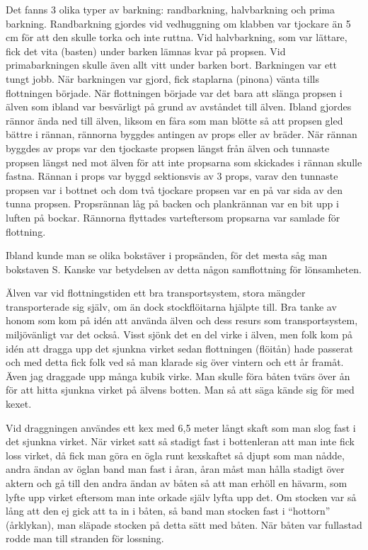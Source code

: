 Det fanns 3 olika typer av barkning: randbarkning, halvbarkning och prima barkning. Randbarkning gjordes vid vedhuggning om klabben var tjockare än 5 cm för att den skulle torka och inte ruttna. Vid halvbarkning, som var lättare, fick det vita (basten) under barken lämnas kvar på propsen. Vid primabarkningen skulle även allt vitt under barken bort. Barkningen var ett tungt jobb. När barkningen var gjord, fick staplarna (pinona) vänta tills flottningen började. När flottningen började var det bara att slänga propsen i älven som ibland var besvärligt på grund av avståndet till älven. Ibland gjordes rännor ända ned till älven, liksom en fåra som man blötte så att propsen gled bättre i rännan, rännorna byggdes antingen av props eller av bräder. När rännan byggdes av props var den tjockaste propsen längst från älven och tunnaste propsen längst ned mot älven för att inte propsarna som skickades i rännan skulle fastna. Rännan i props var byggd sektionsvis av 3 props, varav den tunnaste propsen var i bottnet och dom två tjockare propsen var en på var sida av den tunna propsen. Propsrännan låg på backen och plankrännan var en bit upp i luften på bockar. Rännorna flyttades varteftersom propsarna var samlade för flottning.

Ibland kunde man se olika bokstäver i propsänden, för det mesta såg man bokstaven S. Kanske var betydelsen av detta någon samflottning för lönsamheten.

Älven var vid flottningstiden ett bra transportsystem, stora mängder transporterade sig själv, om än dock stockflöitarna hjälpte till. Bra tanke av honom som kom på idén att använda älven och dess resurs som transportsystem, miljövänligt var det också. Visst sjönk det en del virke i älven, men folk kom på idén att dragga upp det sjunkna virket sedan flottningen (flöitån) hade passerat och med detta fick folk ved så man klarade sig över vintern och ett år framåt. Även jag draggade upp många kubik virke. Man skulle föra båten tvärs över ån för att hitta sjunkna virket på älvens botten. Man så att säga kände sig för med kexet.

Vid draggningen användes ett kex med 6,5 meter långt skaft som man slog fast i det sjunkna virket. När virket satt så stadigt fast i bottenleran att man inte fick loss virket, då fick man göra en ögla runt kexskaftet så djupt som man nådde, andra ändan av öglan band man fast i åran, åran måst man hålla stadigt över aktern och gå till den andra ändan av båten så att man erhöll en hävarm, som lyfte upp virket eftersom man inte orkade själv lyfta upp det. Om stocken var så lång att den ej gick att ta in i båten, så band man stocken fast i ``hottorn'' (årklykan), man släpade stocken på detta sätt med båten. När båten var fullastad rodde man till stranden för lossning.

